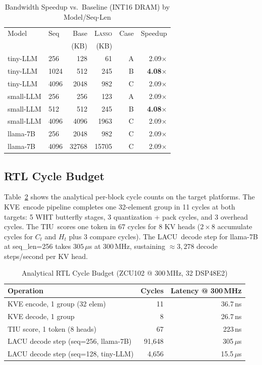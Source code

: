 \documentclass[conference]{IEEEtran}
\newcommand{\lasso}{\textsc{Lasso}}
\newcommand{\kve}{\textsc{KVE}}
\newcommand{\tiu}{\textsc{TIU}}
\newcommand{\lacu}{\textsc{LACU}}
\begin{document}
\begin{table}[t]
\caption{Bandwidth Speedup vs.\ Baseline (INT16 DRAM) by Model/Seq-Len}
\label{tab:speedup}
\centering\small
\begin{tabular}{llrrrr}
\toprule
Model & Seq & Base & \lasso & Case & Speedup \\
      &     & (KB) & (KB)   &      & \\
\midrule
tiny-LLM  & 256  &  128 &  61 & A & 2.09$\times$ \\
tiny-LLM  & 1024 &  512 & 245 & B & \textbf{4.08$\times$} \\
tiny-LLM  & 4096 & 2048 & 982 & C & 2.09$\times$ \\
\midrule
small-LLM & 256  &  256 & 123 & A & 2.09$\times$ \\
small-LLM & 512  &  512 & 245 & B & \textbf{4.08$\times$} \\
small-LLM & 4096 & 4096 &1963 & C & 2.09$\times$ \\
\midrule
llama-7B  & 256  & 2048 & 982 & C & 2.09$\times$ \\
llama-7B  & 4096 &32768 &15705& C & 2.09$\times$ \\
\bottomrule
\end{tabular}
\end{table}

\subsection{RTL Cycle Budget}

Table~\ref{tab:cycles} shows the analytical per-block cycle counts on
the target platforms.  The \kve\ encode pipeline completes one
32-element group in 11 cycles at both targets: 5 WHT butterfly stages,
3 quantization + pack cycles, and 3 overhead cycles.  The \tiu\ scores
one token in 67 cycles for 8 KV heads ($2 \times 8$ accumulate cycles
for $C_t$ and $H_t$ plus 3 compare cycles).  The \lacu\ decode step
for llama-7B at seq\_len=256 takes $305\,\mu$s at 300\,MHz, sustaining
${\approx}3{,}278$ decode steps/second per KV head.

\begin{table}[t]
\caption{Analytical RTL Cycle Budget (ZCU102 @ 300\,MHz, 32 DSP48E2)}
\label{tab:cycles}
\centering\small
\begin{tabular}{lrr}
\toprule
Operation & Cycles & Latency @ 300\,MHz \\
\midrule
KVE encode, 1 group (32 elem) & 11  & 36.7\,ns \\
KVE decode, 1 group            &  8  & 26.7\,ns \\
TIU score, 1 token (8 heads)   & 67  & 223\,ns  \\
LACU decode step (seq=256, llama-7B) & 91,648 & 305\,$\mu$s \\
LACU decode step (seq=128, tiny-LLM) &  4,656 & 15.5\,$\mu$s \\
\bottomrule
\end{tabular}
\end{table}
\end{document}

